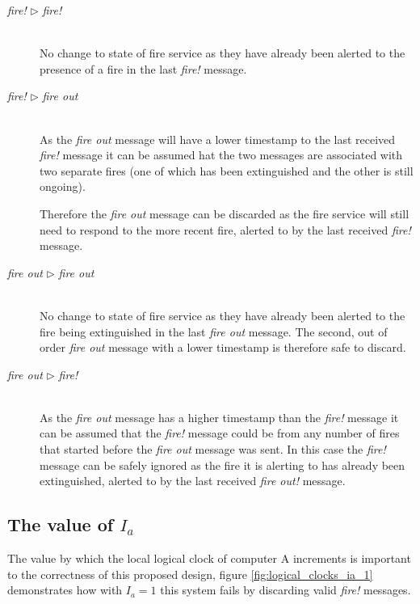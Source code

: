 \documentclass[twocolumn]{article}
\begin{document}
\begin{description}
  \item[\textit{fire!} $\rhd$ \textit{fire!}] \hfill \\
    No change to state of fire service as they have already been alerted to the
    presence of a fire in the last \textit{fire!} message.

  \item[\textit{fire!} $\rhd$ \textit{fire out}] \hfill \\
    As the \textit{fire out} message will have a lower timestamp to the last
    received \textit{fire!} message it can be assumed hat the two messages are
    associated with two separate fires (one of which has been extinguished and
    the other is still ongoing).

    Therefore the \textit{fire out} message can be discarded as the fire service
    will still need to respond to the more recent fire, alerted to by the last
    received \textit{fire!} message.

  \item[\textit{fire out} $\rhd$ \textit{fire out}] \hfill \\
    No change to state of fire service as they have already been alerted to the
    fire being extinguished in the last \textit{fire out} message.
    The second, out of order \textit{fire out} message with a lower timestamp
    is therefore safe to discard.

  \item[\textit{fire out} $\rhd$ \textit{fire!}] \hfill \\
    As the \textit{fire out} message has a higher timestamp than the
    \textit{fire!} message it can be assumed that the \textit{fire!} message
    could be from any number of fires that started before the \textit{fire out}
    message was sent.
    In this case the \textit{fire!} message can be safely ignored as the fire it
    is alerting to has already been extinguished, alerted to by the last
    received \textit{fire out!} message.
\end{description}

\subsection{The value of $I_{a}$}

The value by which the local logical clock of computer A increments is important
to the correctness of this proposed design, figure \ref{fig:logical_clocks_ia_1}
demonstrates how with $I_{a} = 1$ this system fails by discarding valid
\textit{fire!} messages.
\end{document}
